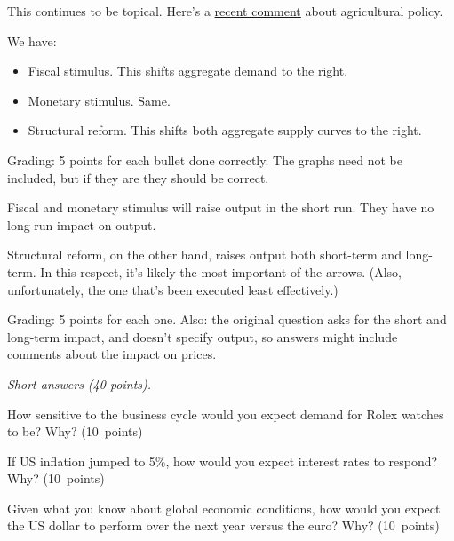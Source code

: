 \documentclass[letterpaper,12pt]{exam}
\begin{document}
\begin{questions}
\begin{solution}

This continues to be topical.
Here's a
\href{http://www.bloomberg.com/news/2013-12-12/abe-pushes-biggest-farm-revamp-since-macarthur-broke-landlords.html}
{recent comment} about agricultural policy.

\begin{parts}
\item We have:
\begin{itemize}
\item Fiscal stimulus. This shifts aggregate demand to the right.
\item Monetary stimulus. Same.
\item Structural reform. This shifts both aggregate supply curves to the right.
\end{itemize}
Grading:  5 points for each bullet done correctly.
The graphs need not be included, but if they are they should be correct.

\item Fiscal and monetary stimulus will raise output in the short run.
They have no long-run impact on output.

Structural reform, on the other hand, raises output both short-term and long-term.
In this respect, it's likely the most important of the arrows.
(Also, unfortunately, the one that's been executed least effectively.)

Grading: 5 points for each one.
Also:  the original question asks for the short and long-term impact, and doesn't
specify output, so answers might include comments about the impact on prices.
\end{parts}
\end{solution}


\item  {\it Short answers (40 points).\/}
\begin{parts}
\item  How sensitive to the business cycle would you expect demand for Rolex watches to be?
Why?
(10~points)

\item If US inflation jumped to 5\%, how would you expect
interest rates to respond?  Why?
(10~points)

\item  Given what you know about global economic conditions,
how would you expect the US dollar to perform over the next year versus the euro?  Why?
(10~points)


\end{parts}
\end{questions}
\end{document}
